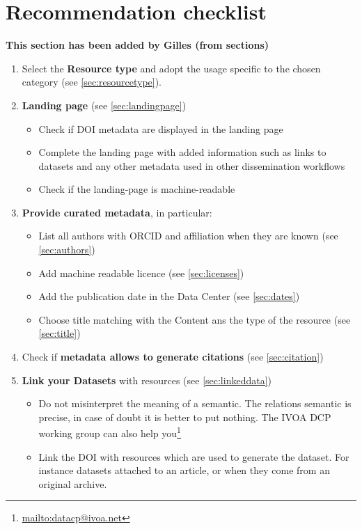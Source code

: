 \documentclass[11pt,a4paper]{ivoa}
\begin{document}
\section{Recommendation checklist}
\textbf{\color{red}This section has been added by Gilles (from sections)}

\begin{enumerate}
	\item Select the \textbf{Resource type} and adopt the usage specific to the chosen category (see \ref{sec:resourcetype}).
	\item \textbf{Landing page} (see \ref{sec:landingpage})
	\begin{itemize}
		\item Check if DOI metadata are displayed in the landing page 
		\item Complete the landing page with added information such as links to datasets and any other metadata used in other dissemination workflows
		\item Check if the landing-page is machine-readable
	\end{itemize}
	\item \textbf{Provide curated metadata}, in particular:
	\begin{itemize}
		\item List all authors with ORCID and affiliation when they are known (see \ref{sec:authors})
		\item Add machine readable licence (see \ref{sec:licenses})
		\item Add the publication date in the Data Center (see \ref{sec:dates})
		\item Choose title  matching with the Content ans the type of the resource  (see \ref{sec:title})
	\end{itemize}
	\item Check if \textbf{metadata allows to generate citations} (see \ref{sec:citation})
	\item \textbf{Link your Datasets} with resources (see \ref{sec:linkeddata})
	\begin{itemize}	
		\item Do not misinterpret the meaning of a semantic. The relations semantic is precise, in case of doubt it is better to put nothing. 
		The IVOA DCP working group can also help you\footnote{\url{mailto:datacp@ivoa.net}}
		\item Link the DOI with resources which are used to generate the dataset. For instance datasets attached to an article, or when they come from an original archive.

\end{itemize}
\end{enumerate}
\end{document}
